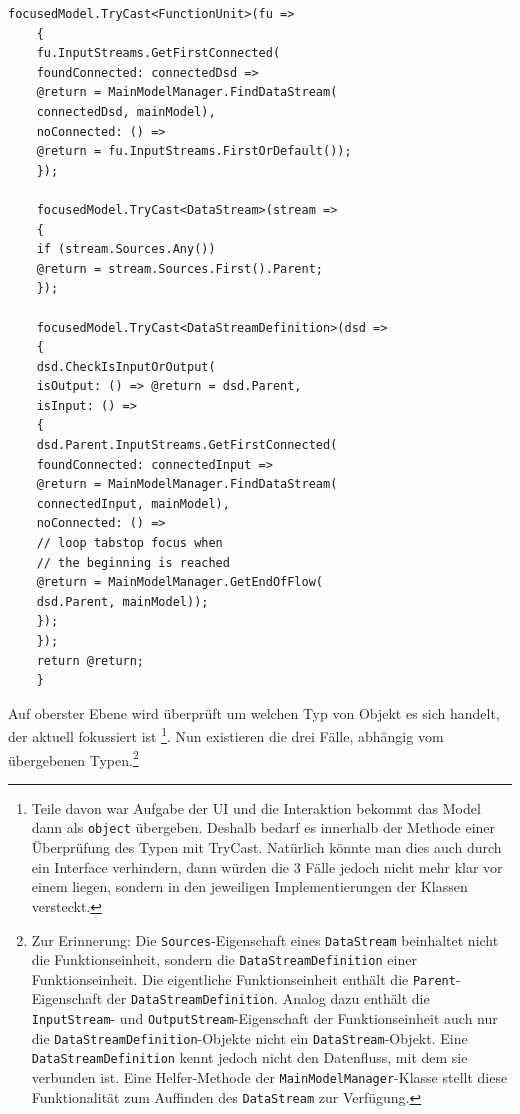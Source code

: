 \begin{enumerate}
\begin{lstlisting}[caption=Tabstop rückwärts]
	focusedModel.TryCast<FunctionUnit>(fu => 
	{
	fu.InputStreams.GetFirstConnected(
	foundConnected: connectedDsd => 
	@return = MainModelManager.FindDataStream(
	connectedDsd, mainModel),
	noConnected: () =>
	@return = fu.InputStreams.FirstOrDefault());
	});
	
	focusedModel.TryCast<DataStream>(stream => 
	{
	if (stream.Sources.Any())
	@return = stream.Sources.First().Parent;
	});
	
	focusedModel.TryCast<DataStreamDefinition>(dsd => 
	{
	dsd.CheckIsInputOrOutput(
	isOutput: () => @return = dsd.Parent,
	isInput: () => 
	{
	dsd.Parent.InputStreams.GetFirstConnected(
	foundConnected: connectedInput =>
	@return = MainModelManager.FindDataStream(
	connectedInput, mainModel),
	noConnected: () =>
	// loop tabstop focus when
	// the beginning is reached
	@return = MainModelManager.GetEndOfFlow(
	dsd.Parent, mainModel));
	});
	});	
	return @return;
	}
	\end{lstlisting}
	
	
	
	Auf oberster Ebene wird überprüft um welchen Typ von Objekt es sich
	handelt, der aktuell fokussiert ist \footnote{Teile davon war Aufgabe der UI und die
		Interaktion bekommt das Model dann als \texttt{object} übergeben. Deshalb bedarf es
		innerhalb der Methode einer Überprüfung des Typen mit TryCast. Natürlich
		könnte man dies auch durch ein Interface verhindern, dann würden die 3 Fälle
		jedoch nicht mehr klar vor einem liegen, sondern in den jeweiligen
		Implementierungen der Klassen versteckt.}. Nun existieren die drei Fälle, abhängig vom übergebenen Typen.\footnote{Zur Erinnerung: Die \texttt{Sources}-Eigenschaft eines \texttt{DataStream} beinhaltet nicht die Funktionseinheit,
		sondern die \texttt{DataStreamDefinition} einer Funktionseinheit. Die eigentliche
		Funktionseinheit enthält die \texttt{Parent}-Eigenschaft der \texttt{DataStreamDefinition}.
		Analog dazu enthält die \texttt{InputStream}- und \texttt{OutputStream}-Eigenschaft der
		Funktionseinheit auch nur die \texttt{DataStreamDefinition}-Objekte nicht ein \texttt{DataStream}-Objekt.
		Eine \texttt{DataStreamDefinition} kennt jedoch nicht den Datenfluss, mit dem sie
		verbunden ist. Eine Helfer-Methode der \texttt{MainModelManager}-Klasse stellt
		diese Funktionalität zum Auffinden des \texttt{DataStream} zur Verfügung.}
\end{enumerate}



